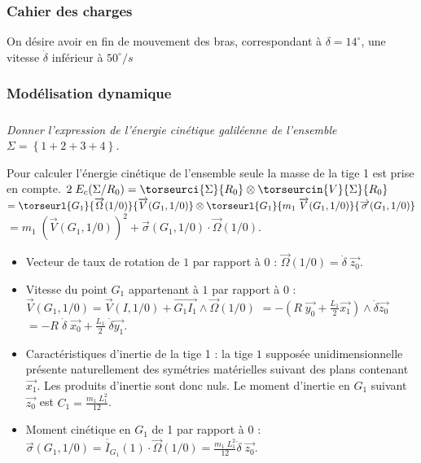 \begin{multicols}{2}
\subsubsection*{Cahier des charges}
On désire avoir en fin de mouvement des bras, correspondant à $\delta=14^{\circ}$, une vitesse $\dot{\delta}$ inférieur à $50^{\circ}/s$

\subsubsection*{Modélisation dynamique}

\subparagraph{}
\textit{Donner l'expression de l'énergie cinétique galiléenne de l'ensemble $\Sigma=\left\{1+2+3+4\right\}$.}
\ifprof
\begin{corrige}
Pour calculer l'énergie cinétique de l'ensemble seule la masse de la tige 1 est prise en compte.
$
2\;E_c(\Sigma/R_0)=\torseurci{\Sigma}{R_0}\otimes \torseurcin{V}{\Sigma}{R_0}$
$=\torseurl{G_1}{\overrightarrow{\Omega}(1/0)}{\overrightarrow{V}(G_1,1/0)}\otimes \torseurl{G_1}{m_1\;\overrightarrow{V}(G_1,1/0)}{\overrightarrow{\sigma}(G_1,1/0)}$
$=m_1\;\left(\overrightarrow{V}(G_1,1/0)\right)^2+\overrightarrow{\sigma}(G_1,1/0)\cdot \overrightarrow{\Omega}(1/0). 
$

\begin{itemize}
\item Vecteur de taux de rotation de $1$ par rapport à $0$ : $
\overrightarrow{\Omega}(1/0)=\dot{\delta}\;\overrightarrow{z_0}.
$

\item Vitesse du point $G_1$ appartenant à $1$ par rapport à $0$ : $
\overrightarrow{V}(G_1,1/0)=\overrightarrow{V}(I,1/0)+\overrightarrow{G_1I_1}\wedge\overrightarrow{\Omega}(1/0)$
$=-\left(R\;\overrightarrow{y_0}+\frac{L_1}{2}\overrightarrow{x_1}\right)\wedge\dot{\delta}\overrightarrow{z_0}$
$=-R\;\dot{\delta}\;\overrightarrow{x_0}+\frac{L_1}{2}\;\dot{\delta}\overrightarrow{y_1}$.


\item Caractéristiques d'inertie de la tige 1 : la tige $1$ supposée unidimensionnelle présente naturellement des symétries matérielles suivant des plans contenant $\overrightarrow{x_1}$. Les produits d'inertie sont donc nuls. Le moment d'inertie en $G_1$ suivant $\overrightarrow{z_0}$ est $C_1=\frac{m_1\;L_1^2}{12}$.

\item Moment cinétique en $G_1$ de 1 par rapport à 0 : $
\overrightarrow{\sigma}(G_1,1/0)=\overline{\overline{I}}_{G_1}(1)\cdot \overrightarrow{\Omega}(1/0)=\frac{m_1\;L_1^2}{12}\dot{\delta}\;\overrightarrow{z_0}
$.


\end{itemize}
\end{corrige}
\end{multicols}
